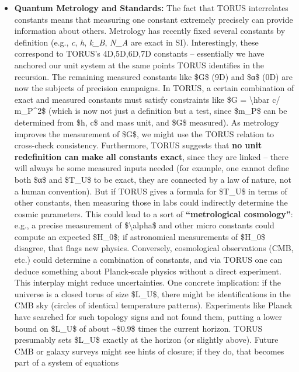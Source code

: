 \documentclass[]{article}
\begin{document}
\begin{itemize}
\item
  \textbf{Quantum Metrology and Standards:} The fact that TORUS
  interrelates constants means that measuring one constant extremely
  precisely can provide information about others. Metrology has recently
  fixed several constants by definition (e.g., \emph{c}, \emph{h},
  \emph{k\_B}, \emph{N\_A} are exact in SI). Interestingly, these
  correspond to TORUS's 4D,5D,6D,7D constants -- essentially we have
  anchored our unit system at the same points TORUS identifies in the
  recursion. The remaining measured constants like \$G\$ (9D) and \$α\$
  (0D) are now the subjects of precision campaigns. In TORUS, a certain
  combination of exact and measured constants must satisfy constraints
  like \$G = \textbackslash{}hbar c/ m\_P\^{}2\$ (which is now not just
  a definition but a test, since \$m\_P\$ can be determined from \$h,
  c\$ and mass unit, and \$G\$ measured). As metrology improves the
  measurement of \$G\$, we might use the TORUS relation to cross-check
  consistency. Furthermore, TORUS suggests that \textbf{no unit
  redefinition can make all constants exact}, since they are linked --
  there will always be some measured inputs needed (for example, one
  cannot define both \$α\$ and \$T\_U\$ to be exact, they are connected
  by a law of nature, not a human convention). But if TORUS gives a
  formula for \$T\_U\$ in terms of other constants, then measuring those
  in labs could indirectly determine the cosmic parameters. This could
  lead to a sort of \textbf{``metrological cosmology''}: e.g., a precise
  measurement of \$\textbackslash{}alpha\$ and other micro constants
  could compute an expected \$H\_0\$; if astronomical measurements of
  \$H\_0\$ disagree, that flags new physics. Conversely, cosmological
  observations (CMB, etc.) could determine a combination of constants,
  and via TORUS one can deduce something about Planck-scale physics
  without a direct experiment. This interplay might reduce
  uncertainties. One concrete implication: if the universe is a closed
  torus of size \$L\_U\$, there might be identifications in the CMB sky
  (circles of identical temperature patterns). Experiments like Planck
  have searched for such topology signs and not found them, putting a
  lower bound on \$L\_U\$ of about \textasciitilde{}\$0.9\$ times the
  current horizon. TORUS presumably sets \$L\_U\$ exactly at the horizon
  (or slightly above). Future CMB or galaxy surveys might see hints of
  closure; if they do, that becomes part of a system of equations

\end{itemize}
\end{document}
